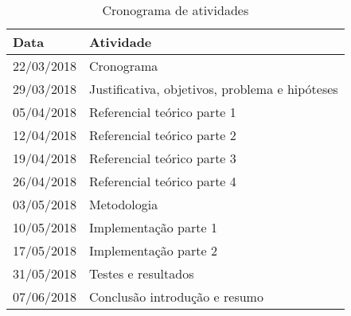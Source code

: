 \begin{table}[htb]
\captionsetup{justification=centering}
\caption{Cronograma de atividades}
\label{tbCrono}
\begin{tabular}{p{5cm}|p{10cm}}
    \hline
    \textbf{Data} & \textbf{Atividade} \\
    \hline
    22/03/2018 & Cronograma \\
    \hline
    29/03/2018 & Justificativa, objetivos, problema e hipóteses\\
    \hline
    05/04/2018 & Referencial teórico parte 1 \\
    \hline
    12/04/2018 & Referencial teórico parte 2 \\
    \hline
    19/04/2018 & Referencial teórico parte 3 \\
    \hline
    26/04/2018 & Referencial teórico parte 4 \\
    \hline
    03/05/2018 & Metodologia \\
    \hline
    10/05/2018 & Implementação parte 1\\
    \hline
    17/05/2018 & Implementação parte 2\\
    \hline
    31/05/2018 & Testes e resultados \\
    \hline
    07/06/2018 & Conclusão introdução e resumo \\
    \hline
\end{tabular}
\end{table}